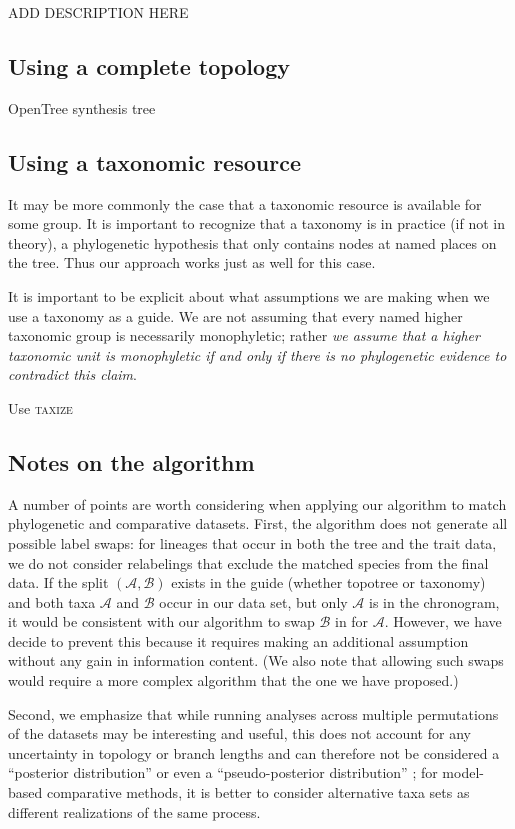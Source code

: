 \documentclass[a4paper,11pt]{article}
\begin{document}
ADD DESCRIPTION HERE

\subsection{Using a complete topology}

OpenTree synthesis tree

\subsection{Using a taxonomic resource}

It may be more commonly the case that a taxonomic resource is available for some group. It is important to recognize that a taxonomy is in practice (if not in theory), a phylogenetic hypothesis that only contains nodes at named places on the tree. Thus our approach works just as well for this case.

It is important to be explicit about what assumptions we are making when we use a taxonomy as a guide. We are not assuming that every named higher taxonomic group is necessarily monophyletic; rather \emph{we assume that a higher taxonomic unit is monophyletic if and only if there is no phylogenetic evidence to contradict this claim}.  

Use \textsc{taxize} \citep{taxize}

\subsection{Notes on the algorithm}

A number of points are worth considering when applying our algorithm to match phylogenetic and comparative datasets. First, the algorithm does not generate all possible label swaps: for lineages that occur in both the tree and the trait data, we do not consider relabelings that exclude the matched species from the final data. If the split $(\mathcal{A,B})$ exists in the guide (whether topotree or taxonomy) and both taxa $\mathcal{A}$ and $\mathcal{B}$ occur in our data set, but only $\mathcal{A}$ is in the chronogram, it would be consistent with our algorithm to swap $\mathcal{B}$ in for $\mathcal{A}$. However, we have decide to prevent this because it requires making an additional assumption without any gain in information content. (We also note that allowing such swaps would require a more complex algorithm that the one we have proposed.) 

Second, we emphasize that while running analyses across multiple permutations of the datasets may be interesting and useful, this does not account for any uncertainty in topology or branch lengths and can therefore not be considered a ``posterior distribution'' or even a ``pseudo-posterior distribution'' \citep[\emph{sensu}][]{ThomasPastis, Rabosky2015}; for model-based comparative methods, it is better to consider alternative taxa sets as different realizations of the same process. 
\end{document}
